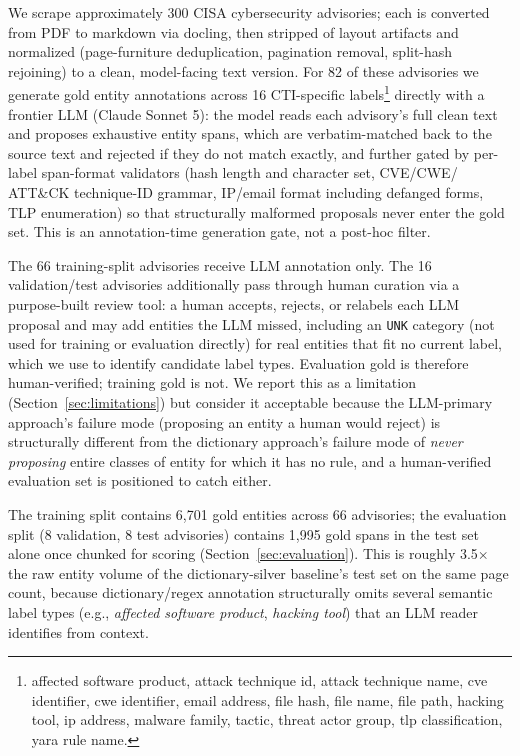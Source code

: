 \documentclass[11pt]{article}
\begin{document}
We scrape approximately 300 CISA cybersecurity advisories; each is
converted from PDF to markdown via docling, then stripped of layout artifacts
and normalized (page-furniture deduplication, pagination removal, split-hash
rejoining) to a clean, model-facing text version. For 82 of these advisories
we generate gold entity annotations across 16 CTI-specific
labels\footnote{affected software product, attack technique id, attack
technique name, cve identifier, cwe identifier, email address, file hash,
file name, file path, hacking tool, ip address, malware family, tactic,
threat actor group, tlp classification, yara rule name.} directly with a
frontier LLM (Claude Sonnet 5): the model reads each advisory's full clean text
and proposes exhaustive entity spans, which are verbatim-matched back to the
source text and rejected if they do not match exactly, and further gated by
per-label span-format validators (hash length and character set, CVE/CWE/%
ATT\&CK technique-ID grammar, IP/email format including defanged forms, TLP
enumeration) so that structurally malformed proposals never enter the gold
set. This is an annotation-time generation gate, not a post-hoc filter.

The 66 training-split advisories receive LLM annotation only. The 16
validation/test advisories additionally pass through human curation via a
purpose-built review tool: a human accepts, rejects, or relabels each LLM
proposal and may add entities the LLM missed, including an \texttt{UNK}
category (not used for training or evaluation directly) for real entities
that fit no current label, which we use to identify candidate label types.
Evaluation gold is therefore human-verified; training gold is not. We report
this as a limitation (Section~\ref{sec:limitations}) but consider it
acceptable because the LLM-primary approach's failure mode (proposing an
entity a human would reject) is structurally different from the dictionary
approach's failure mode of \emph{never proposing} entire classes of entity
for which it has no rule, and a human-verified evaluation set is positioned
to catch either.

The training split contains 6{,}701 gold entities across 66 advisories; the
evaluation split (8 validation, 8 test advisories) contains 1{,}995 gold
spans in the test set alone once chunked for scoring
(Section~\ref{sec:evaluation}). This is roughly 3.5$\times$ the raw entity
volume of the dictionary-silver baseline's test set on the same page
count, because dictionary/regex annotation structurally omits several
semantic label types (e.g., \emph{affected software product}, \emph{hacking
tool}) that an LLM reader identifies from context.
\end{document}
